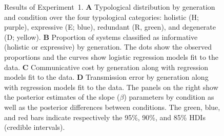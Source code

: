 \documentclass[doc,biblatex]{apa7}
\begin{document}
	\begin{figure}
	\vspace*{2pt}
	\caption{Results of Experiment~1. \textbf{A} Typological distribution by generation and condition over the four typological categories: holistic (H; purple), expressive (E; blue), redundant (R, green), and degenerate (D; yellow). \textbf{B} Proportion of systems classified as informative (holistic or expressive) by generation. The dots show the observed proportions and the curves show logistic regression models fit to the data. \textbf{C} Communicative cost by generation along with regression models fit to the data. \textbf{D} Transmission error by generation along with regression models fit to the data. The panels on the right show the posterior estimates of the slope ($\beta$) parameters by condition as well as the posterior differences between conditions. The green, blue, and red bars indicate respectively the 95\%, 90\%, and 85\% HDIs (credible intervals).}
	\label{fig07}
	\end{figure}
\end{document}
